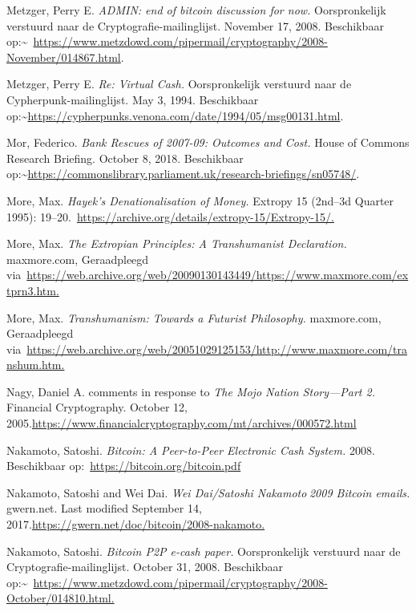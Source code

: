 \documentclass[smalldemyvopaper,11pt,twoside,onecolumn,openright,extrafontsizes,hidelinks]{memoir}
\begin{document}
Metzger, Perry E. \emph{ADMIN: end of bitcoin discussion for now.}
Oorspronkelijk verstuurd naar de Cryptografie-mailinglijst. November 17,
2008. Beschikbaar
op:\textasciitilde~\url{https://www.metzdowd.com/pipermail/cryptography/2008-November/014867.html}.

Metzger, Perry E. \emph{Re: Virtual Cash.} Oorspronkelijk verstuurd naar
de Cypherpunk-mailinglijst. May 3, 1994. Beschikbaar
op:\textasciitilde{}\url{https://cypherpunks.venona.com/date/1994/05/msg00131.html}.

Mor, Federico. \emph{Bank Rescues of 2007-09: Outcomes and Cost.} House
of Commons Research Briefing. October 8, 2018. Beschikbaar
op:\textasciitilde{}\url{https://commonslibrary.parliament.uk/research-briefings/sn05748/}.

More, Max. \emph{Hayek's Denationalisation of Money.} Extropy 15
(2nd--3d Quarter 1995):
19--20.~\href{https://archive.org/details/extropy-15/Extropy-15/}{https://archive.org/details/extropy-15/Extropy-15/.}

More, Max. \emph{The Extropian Principles: A Transhumanist Declaration.}
maxmore.com, Geraadpleegd
via~\href{https://web.archive.org/web/20090130143449/https:/www.maxmore.com/extprn3.htm}{https://web.archive.org/web/20090130143449/https://www.maxmore.com/extprn3.htm.}

More, Max. \emph{Transhumanism: Towards a Futurist Philosophy.}
maxmore.com, Geraadpleegd
via~\href{https://web.archive.org/web/20051029125153/http:/www.maxmore.com/transhum.htm}{https://web.archive.org/web/20051029125153/http://www.maxmore.com/transhum.htm.}

Nagy, Daniel A. comments in response to \emph{The Mojo Nation
Story---Part 2.} Financial Cryptography. October 12,
2005.\url{https://www.financialcryptography.com/mt/archives/000572.html}

Nakamoto, Satoshi. \emph{Bitcoin: A Peer-to-Peer Electronic Cash
System.} 2008. Beschikbaar op:~\url{https://bitcoin.org/bitcoin.pdf}

Nakamoto, Satoshi and Wei Dai. \emph{Wei Dai/Satoshi Nakamot{o }2009
Bitcoin emails.} gwern.net. Last modified September 14,
2017.\href{https://gwern.net/doc/bitcoin/2008-nakamoto}{https://gwern.net/doc/bitcoin/2008-nakamoto.}

Nakamoto, Satoshi. \emph{Bitcoin P2P e-cash paper.} Oorspronkelijk
verstuurd naar de Cryptografie-mailinglijst. October 31, 2008.
Beschikbaar
op:\textasciitilde~\href{https://www.metzdowd.com/pipermail/cryptography/2008-October/014810.html}{https://www.metzdowd.com/pipermail/cryptography/2008-October/014810.html.}
\end{document}
